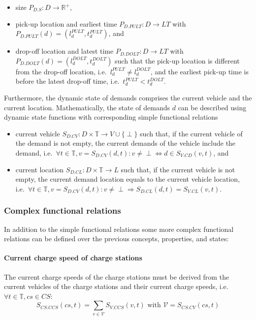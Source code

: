 \documentclass[graybox]{svmult}
\begin{document}
\begin{itemize}
	\item size $P_{D.S}: D \rightarrow \mathbb{R}^+$,
	\item pick-up location and earliest time $P_{D.PULT}: D \rightarrow LT$ with $P_{D.PULT}(d) = (l_d^{PULT},t_d^{PULT})$, and
	\item drop-off location and latest time $P_{D.DOLT}: D \rightarrow LT$ with $P_{D.DOLT}(d) = (l_d^{DOLT},t_d^{DOLT})$ such that the pick-up location is different from the drop-off location, i.e.\ $l_d^{PULT} \neq l_d^{DOLT}$, and the earliest pick-up time is before the latest drop-off time, i.e.\ $t_d^{PULT} < t_d^{DOLT}$.
\end{itemize}
Furthermore, the dynamic state of demands comprises the current vehicle and the current location.
Mathematically, the state of demands $d$ can be described using dynamic state functions with corresponding simple functional relations
\begin{itemize}
	\item current vehicle $S_{D.CV}: D \times \mathbb{T} \rightarrow V \cup \{\perp\}$ such that, if the current vehicle of the demand is not empty, the current demands of the vehicle include the demand, i.e.\ $\forall t \in \mathbb{T}, v = S_{D.CV}(d,t): v \neq \perp \Leftrightarrow d \in S_{V.CD}(v,t)$, and
	\item current location $S_{D.CL}: D \times \mathbb{T} \rightarrow L$ such that, if the current vehicle is not empty, the current demand location equals to the current vehicle location, i.e.\ $\forall t \in \mathbb{T}, v = S_{D.CV}(d,t): v \neq \perp \Rightarrow S_{D.CL}(d,t)=S_{V.CL}(v,t)$.
\end{itemize}

\subsubsection{Complex functional relations}
In addition to the simple functional relations some more complex functional relations can be defined over the previous concepts, properties, and states:

\paragraph{Current charge speed of charge stations}
The current charge speeds of the charge stations must be derived from the current vehicles of the charge stations and their current charge speeds, i.e.\ $\forall t \in \mathbb{T}, cs \in CS:$
\[
S_{CS.CCS}(cs,t)=\sum_{v \in \mathcal{V}}S_{V.CCS}(v,t) \textrm{ with } \mathcal{V}=S_{CS.CV}(cs,t)
\]
\end{document}
